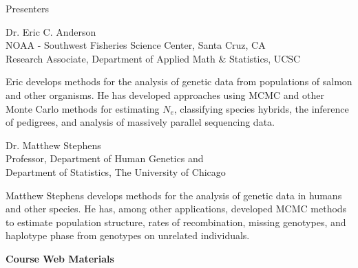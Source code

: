 
\vspace*{1in}
\begin{center}\color{section0}\bf\Large
\coursetitlepage
\end{center}
\es\bs

\begin{center}\color{section0} Presenters\end{center}
\enlargethispage*{1000pt}

{\small
{\color{section0}Dr. Eric C. Anderson\\
NOAA - Southwest Fisheries Science Center, Santa Cruz, CA\\
Research Associate, Department of Applied Math \& Statistics, UCSC}

Eric develops methods for the analysis of genetic data from populations of salmon and other organisms.  He has developed approaches using MCMC and other Monte Carlo methods for estimating $N_e$, classifying species hybrids, the inference of pedigrees, and analysis of massively parallel sequencing data.

{\small
{\color{section0}Dr. Matthew Stephens\\
Professor, Department of Human Genetics and\\
Department of Statistics, The University of Chicago}	

Matthew Stephens develops methods for the analysis of genetic data in humans and other species. He has, among other applications, developed MCMC methods to estimate population structure, rates of recombination, missing genotypes, and haplotype phase from genotypes on unrelated individuals.

%   

}

\es\bs
\begin{center}
{\color{section0}\bf\Large Course Web Materials}
\end{center}
\vspace*{.25in}
\enlargethispage*{1000pt}

}

